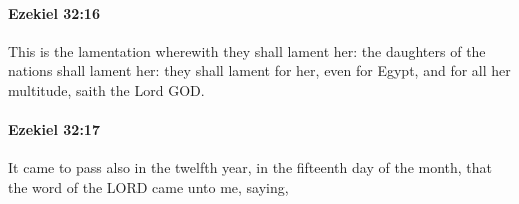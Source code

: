 		\paragraph{Ezekiel 32:16} %
			\label{EZEKIEL-32-16}

			This is the lamentation wherewith they shall lament her: the daughters of the nations shall lament her: they shall lament for her, even for Egypt, and for all her multitude, saith the Lord GOD.


		\paragraph{Ezekiel 32:17} %
			\label{EZEKIEL-32-17}

			It came to pass also in the twelfth year, in the fifteenth day of the month, that the word of the LORD came unto me, saying,


